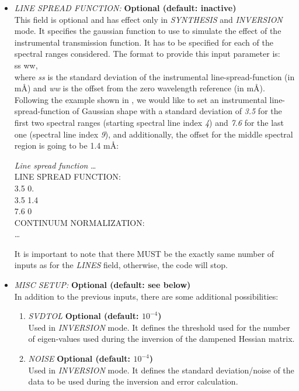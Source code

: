 \begin{itemize}
  \item {\it LINE SPREAD FUNCTION:} {\bf Optional (default: inactive)}\\
  This field is optional and has effect only in {\it SYNTHESIS} and {\it INVERSION} mode. It specifies the gaussian function to use to simulate the effect of the instrumental transmission function. It has to be specified for each of the spectral ranges considered. The format to provide this input parameter is:\\
  ss  ww,\\
  where {\it ss} is the standard deviation of the instrumental line-spread-function (in m{\AA}) and {\it ww} is the offset from the zero wavelength reference (in m{\AA}). Following the example shown in , we would like to set an instrumental line-spread-function of Gaussian shape with a standard deviation of {\it 3.5} for the first two spectral ranges (starting spectral line index {\it 4}) and {\it 7.6} for the last one (spectral line index {\it 9}), and additionally, the offset for the middle spectral region is going to be 1.4 m{\AA}:\\
\begin{ifbox}[label={tb:line_spread_function}]{{\it Line spread function}}
  \scriptsize
  \ldots\\
  LINE SPREAD FUNCTION:\\
  3.5 0.\\
  3.5 1.4\\
  7.6 0\\
  CONTINUUM NORMALIZATION:\\
  \ldots
  \normalsize
\end{ifbox}
  It is important to note that there MUST be the exactly same number of inputs as for the {\it LINES} field, otherwise, the code will stop.
  \item {\it MISC SETUP:} {\bf Optional (default: see below)}\\
  In addition to the previous inputs, there are some additional possibilities:
  \begin{enumerate}
    \item {\it SVDTOL} {\bf Optional (default: $10^{-4}$)}\\
    Used in {\it INVERSION} mode. It defines the threshold used for the number of eigen-values used during the inversion of the dampened Hessian matrix.
    \item {\it NOISE} {\bf Optional (default: $10^{-4}$)}\\
    Used in {\it INVERSION} mode. It defines the standard deviation/noise of the data to be used during the inversion and error calculation.

\end{enumerate}
\end{itemize}
